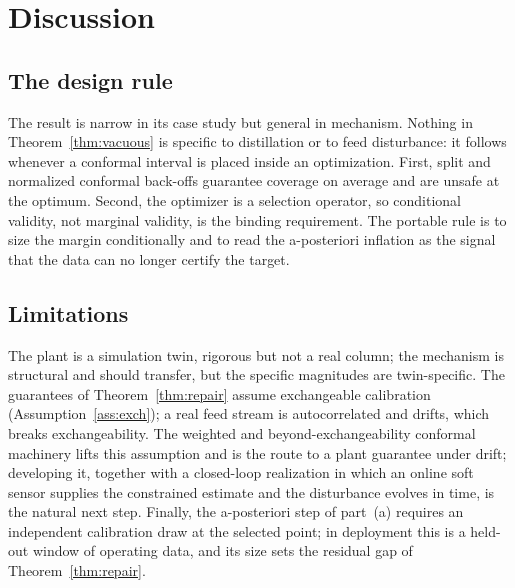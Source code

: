 \documentclass[journal]{IEEEtran}
\begin{document}
\section{Discussion}
\label{sec:discussion}

\subsection{The design rule}
The result is narrow in its case study but general in mechanism. Nothing in
Theorem~\ref{thm:vacuous} is specific to distillation or to feed disturbance: it follows whenever
a conformal interval is placed inside an optimization. First, split and normalized conformal
back-offs guarantee coverage on average and are unsafe at the optimum. Second, the optimizer is a
selection operator, so conditional validity, not marginal validity, is the binding requirement.
The portable rule is to size the margin conditionally and to read the a-posteriori inflation as
the signal that the data can no longer certify the target.

\subsection{Limitations}
The plant is a simulation twin, rigorous but not a real column; the mechanism is structural and
should transfer, but the specific magnitudes are twin-specific. The guarantees of
Theorem~\ref{thm:repair} assume exchangeable calibration (Assumption~\ref{ass:exch}); a real feed
stream is autocorrelated and drifts, which breaks exchangeability. The weighted and
beyond-exchangeability conformal machinery \cite{tibshirani2019,barber2023,gibbs2021} lifts this
assumption and is the route to a plant guarantee under drift; developing it, together with a
closed-loop realization in which an online soft sensor supplies the constrained estimate and the
disturbance evolves in time, is the natural next step. Finally, the a-posteriori step of
part~(a) requires an independent calibration draw at the selected point; in deployment this is a
held-out window of operating data, and its size sets the residual gap of Theorem~\ref{thm:repair}.
\end{document}
